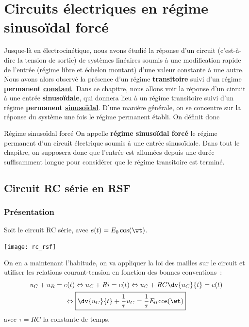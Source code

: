 \documentclass[../main/main.tex]{subfiles}
\begin{document}
\setcounter{chapter}{4}

\chapter{Circuits \'electriques en r\'egime sinuso\"idal forc\'e}

Jusque-là en électrocinétique, nous avons étudié la réponse d'un circuit
(c'est-à-dire la tension de sortie) de systèmes linéaires soumis à une
modification rapide de l'entrée (régime libre et échelon montant) d'une valeur
constante à une autre. Nous avons alors observé la présence d'un régime
\textbf{transitoire} suivi d'un régime \textbf{permanent \underline{constant}}.
Dans ce chapitre, nous allons voir la réponse d'un circuit à une entrée
\textbf{sinusoïdale}, qui donnera lieu à un régime transitoire suivi d'un régime
\textbf{permanent \underline{sinusoïdal}}. D'une manière générale, on se
concentre sur la réponse du système une fois le régime permanent établi. On
définit donc

\begin{defi}[label=def:rsf]{Régime sinusoïdal forcé}
    On appelle \textbf{régime sinusoïdal forcé} le régime permanent d'un circuit
    électrique soumis à une entrée sinusoïdale. Dans tout le chapitre, on
    supposera donc que l'entrée est allumées depuis une durée suffisamment
    longue pour considérer que le régime transitoire est terminé.
\end{defi}

\section{Circuit RC série en RSF}
\subsection{Présentation}
Soit le circuit RC série, avec $e(t) = E_0\cos(\wt)$.
\begin{center}
    \texttt{[image: rc\_rsf]}
\end{center}
On en a maintenant l'habitude, on va appliquer la loi des mailles sur le circuit
et utiliser les relations courant-tension en fonction des bonnes conventions~:
\begin{gather*}
    u_C + u_R = e(t)
    \Leftrightarrow
    u_C + Ri = e(t)
    \Leftrightarrow
    u_C + RC \dv{u_C}{t} = e(t)\\
    \Leftrightarrow
    \boxed{ \dv{u_C}{t} + \frac{1}{\tau}u_C = \frac{1}{\tau}E_0\cos(\wt)}
\end{gather*}
avec $\tau = RC$ la constante de temps.
\end{document}
